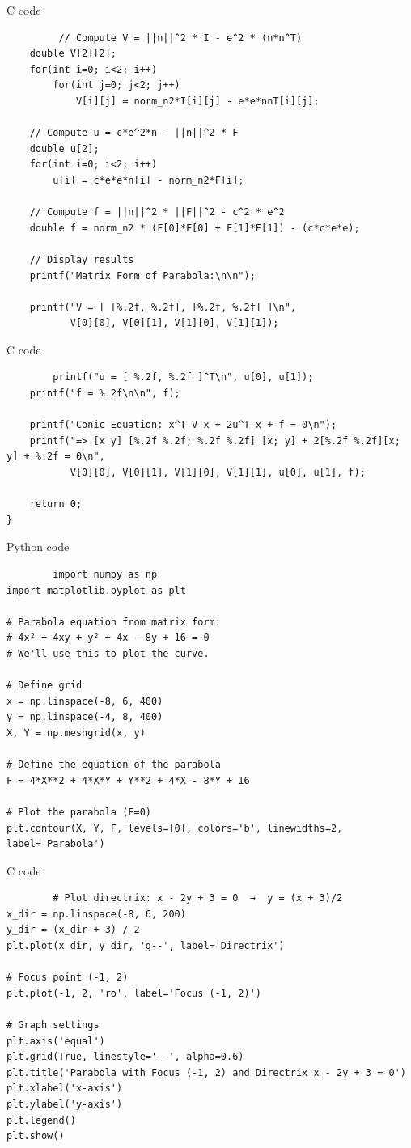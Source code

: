 \documentclass{beamer}
\begin{document}
\begin{frame}[fragile]{C code}
    \begin{lstlisting}
         // Compute V = ||n||^2 * I - e^2 * (n*n^T)
    double V[2][2];
    for(int i=0; i<2; i++)
        for(int j=0; j<2; j++)
            V[i][j] = norm_n2*I[i][j] - e*e*nnT[i][j];

    // Compute u = c*e^2*n - ||n||^2 * F
    double u[2];
    for(int i=0; i<2; i++)
        u[i] = c*e*e*n[i] - norm_n2*F[i];

    // Compute f = ||n||^2 * ||F||^2 - c^2 * e^2
    double f = norm_n2 * (F[0]*F[0] + F[1]*F[1]) - (c*c*e*e);

    // Display results
    printf("Matrix Form of Parabola:\n\n");

    printf("V = [ [%.2f, %.2f], [%.2f, %.2f] ]\n",
           V[0][0], V[0][1], V[1][0], V[1][1]);
    \end{lstlisting}
\end{frame}

\begin{frame}[fragile]{C code}
    \begin{lstlisting}
        printf("u = [ %.2f, %.2f ]^T\n", u[0], u[1]);
    printf("f = %.2f\n\n", f);

    printf("Conic Equation: x^T V x + 2u^T x + f = 0\n");
    printf("=> [x y] [%.2f %.2f; %.2f %.2f] [x; y] + 2[%.2f %.2f][x; y] + %.2f = 0\n",
           V[0][0], V[0][1], V[1][0], V[1][1], u[0], u[1], f);

    return 0;
}
    \end{lstlisting}
\end{frame}

\begin{frame}[fragile]{Python code}
    \begin{lstlisting}
        import numpy as np
import matplotlib.pyplot as plt

# Parabola equation from matrix form:
# 4x² + 4xy + y² + 4x - 8y + 16 = 0
# We'll use this to plot the curve.

# Define grid
x = np.linspace(-8, 6, 400)
y = np.linspace(-4, 8, 400)
X, Y = np.meshgrid(x, y)

# Define the equation of the parabola
F = 4*X**2 + 4*X*Y + Y**2 + 4*X - 8*Y + 16

# Plot the parabola (F=0)
plt.contour(X, Y, F, levels=[0], colors='b', linewidths=2, label='Parabola')
    \end{lstlisting}
\end{frame}

\begin{frame}[fragile]{C code}
    \begin{lstlisting}
        # Plot directrix: x - 2y + 3 = 0  →  y = (x + 3)/2
x_dir = np.linspace(-8, 6, 200)
y_dir = (x_dir + 3) / 2
plt.plot(x_dir, y_dir, 'g--', label='Directrix')

# Focus point (-1, 2)
plt.plot(-1, 2, 'ro', label='Focus (-1, 2)')

# Graph settings
plt.axis('equal')
plt.grid(True, linestyle='--', alpha=0.6)
plt.title('Parabola with Focus (-1, 2) and Directrix x - 2y + 3 = 0')
plt.xlabel('x-axis')
plt.ylabel('y-axis')
plt.legend()
plt.show()
    \end{lstlisting}
\end{frame}
\end{document}
